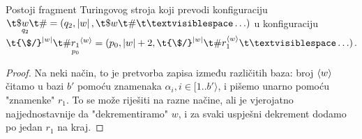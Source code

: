 \begin{lema}\label{lm:faza2}
Postoji fragment Turingovog stroja koji prevodi konfiguraciju $\t\$\underset{q_2}{w}\t\#=(q_2,\left|w\right|,\t\$w\t\#\bl\ldots)$ u konfiguraciju $\t{\$/}^{\left|w\right|}\t\#\underset{p_0}{r_1}^{\kr w}=(p_0,\left|w\right|+2,\t{\$/}^{\left|w\right|}\t\#r_1^{\kr w}\bl\ldots)$.
\end{lema}

\begin{proof}
Na neki način, to je pretvorba zapisa između različitih baza: broj $\langle w\rangle$ čitamo u bazi $b'$ pomoću znamenaka $\alpha_i,i\in[1..b'\rangle$, i pišemo unarno pomoću "znamenke" $r_1$. To se može riješiti na razne načine, ali je vjerojatno najjednostavnije da "dekrementiramo" $w$, i za svaki uspješni dekrement dodamo po jedan $r_1$ na kraj.


\end{proof}
